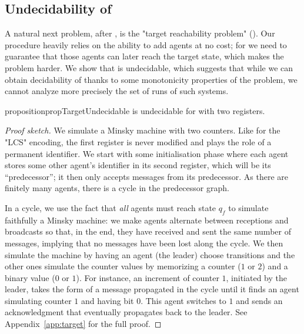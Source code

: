 \subsection{Undecidability of \TARGET}
\label{sec:undec-target}

A natural next problem, after \COVER, is the "target reachability problem" (\TARGET).  
Our \COVER procedure heavily relies on the ability to add agents at no cost; for \TARGET we need to guarantee that those agents can later reach the target state, which makes the problem harder. 
We show that \TARGET is undecidable, which suggests that while we can obtain decidability of \COVER thanks to some monotonicity properties of the problem, we cannot analyze more precisely the set of runs of such systems.

\begin{restatable}{proposition}{propTargetUndecidable}
\label{prop:target-undec}
\TARGET is undecidable for \BNRA with two registers.
\end{restatable}

\begin{proof}[Proof sketch]
We simulate a Minsky machine with two counters. Like for the "LCS" encoding, the first register is never modified and plays the role of a permanent identifier. We start with some initialisation phase where each agent stores some other agent's identifier in its second register, which will be its ``predecessor''; it then only accepts messages from its predecessor. As there are finitely many agents, there is a cycle in the predecessor graph. 

In a cycle, we use the fact that \emph{all} agents must reach state $q_f$ to simulate faithfully a Minsky machine: we make agents alternate between receptions and broadcasts so that, in the end, they have received and sent the same number of messages, implying that no messages have been lost along the cycle.
We then simulate the machine by having an agent (the leader) choose transitions and the other ones simulate the counter values by memorizing a counter ($1$ or $2$) and a binary value ($0$ or $1$). For instance, an increment of counter $1$, initiated by the leader, takes the form of a message propagated in the cycle until it finds an agent simulating counter $1$ and having bit $0$. This agent switches to $1$ and sends an acknowledgment that eventually propagates back to the leader. See Appendix~\ref{app:target} for the full proof. 
\end{proof}
